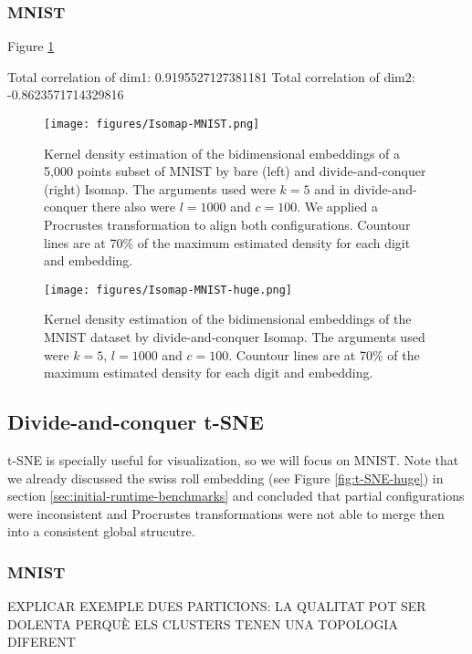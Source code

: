 \subsubsection{MNIST}



Figure \ref{fig:Isomap-MNIST}

Total correlation of dim1: 0.9195527127381181
Total correlation of dim2: -0.8623571714329816

\begin{figure}[ht]
    \centering
    \texttt{[image: figures/Isomap-MNIST.png]}
    \caption{Kernel density estimation of the bidimensional embeddings of a 5,000 points subset of MNIST \citep{Cohen2017} by bare (left) and divide-and-conquer (right) Isomap. The arguments used were $k=5$ and in divide-and-conquer there also were $l=1000$ and $c=100$. We applied a Procrustes transformation to align both configurations. Countour lines are at 70\% of the maximum estimated density for each digit and embedding.}
    \label{fig:Isomap-MNIST}
\end{figure}

\begin{figure}[ht]
    \centering
    \texttt{[image: figures/Isomap-MNIST-huge.png]}
    \caption{Kernel density estimation of the bidimensional embeddings of the MNIST dataset \citep{Cohen2017} by divide-and-conquer Isomap. The arguments used were $k=5, \, l=1000$ and $c=100$. Countour lines are at 70\% of the maximum estimated density for each digit and embedding.}
    \label{fig:Isomap-MNIST-huge}
\end{figure}

\subsection{Divide-and-conquer t-SNE}

t-SNE is specially useful for visualization, so we will focus on MNIST. Note that we already discussed the swiss roll embedding (see Figure \ref{fig:t-SNE-huge}) in section \ref{sec:initial-runtime-benchmarks} and concluded that partial configurations were inconsistent and Procrustes transformations were not able to merge then into a consistent global strucutre.

\subsubsection{MNIST}

EXPLICAR EXEMPLE DUES PARTICIONS: LA QUALITAT POT SER DOLENTA PERQUÈ ELS CLUSTERS TENEN UNA TOPOLOGIA DIFERENT

